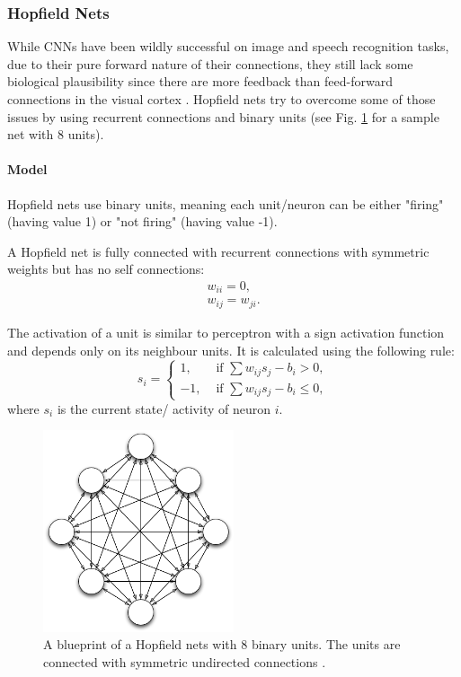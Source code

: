 \subsubsection{Hopfield Nets}

While CNNs have been wildly successful on image and speech recognition tasks, due to their pure forward nature of their connections, they still lack some biological plausibility since there are more feedback than feed-forward connections in the visual cortex .
Hopfield nets try to overcome some of those issues by using recurrent connections and binary units \cite{hopfield1982neural} \cite{Goodfellow-et-al-2016-Book} (see Fig. \ref{fig:hopfiled} for a sample net with 8 units).

\paragraph{Model}

Hopfield nets use binary units, meaning each unit/neuron can be either "firing" (having value 1) or "not firing" (having value -1). 

A Hopfield net  is fully connected with recurrent connections with symmetric weights but has no self connections:
\[
\begin{split}
w_{ii} = 0 , \\
w_{ij} = w_{ji} .
\end{split}
\]

The activation of a unit is similar to perceptron with a sign activation function and depends only on its neighbour units. It is calculated using the following rule:
\[
	s_i = 
		\begin{cases}
			1, & \text{  if  } \sum w_{ij} s_{j} - b_{i}> 0 , \\
			-1, & \text{  if  } \sum w_{ij} s_{j} - b_{i} \le 0,
		\end{cases}	
\]
where $s_i$ is the current state/ activity of neuron $i$.

\begin{figure}
	\centering
    	\includegraphics[width=0.5\textwidth]{imgs/hopfield.png} 
    \caption{A blueprint of a Hopfield nets with 8 binary units. The units are connected with symmetric undirected connections \cite{hopfImg}.}
	\label{fig:hopfiled}
\end{figure}


